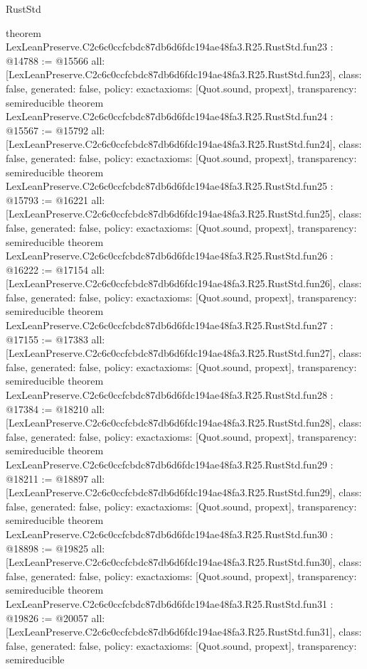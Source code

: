 \begin{lexlean}{RustStd}
\begin{coremodule}
{}
theorem LexLeanPreserve.C2c6c0ccfcbdc87db6d6fdc194ae48fa3.R25.RustStd.fun23 : @14788 := @15566 {
  all: [LexLeanPreserve.C2c6c0ccfcbdc87db6d6fdc194ae48fa3.R25.RustStd.fun23],
  class: false,
  generated: false,
  policy: exact{axioms: [Quot.sound, propext]},
  transparency: semireducible
}
theorem LexLeanPreserve.C2c6c0ccfcbdc87db6d6fdc194ae48fa3.R25.RustStd.fun24 : @15567 := @15792 {
  all: [LexLeanPreserve.C2c6c0ccfcbdc87db6d6fdc194ae48fa3.R25.RustStd.fun24],
  class: false,
  generated: false,
  policy: exact{axioms: [Quot.sound, propext]},
  transparency: semireducible
}
theorem LexLeanPreserve.C2c6c0ccfcbdc87db6d6fdc194ae48fa3.R25.RustStd.fun25 : @15793 := @16221 {
  all: [LexLeanPreserve.C2c6c0ccfcbdc87db6d6fdc194ae48fa3.R25.RustStd.fun25],
  class: false,
  generated: false,
  policy: exact{axioms: [Quot.sound, propext]},
  transparency: semireducible
}
theorem LexLeanPreserve.C2c6c0ccfcbdc87db6d6fdc194ae48fa3.R25.RustStd.fun26 : @16222 := @17154 {
  all: [LexLeanPreserve.C2c6c0ccfcbdc87db6d6fdc194ae48fa3.R25.RustStd.fun26],
  class: false,
  generated: false,
  policy: exact{axioms: [Quot.sound, propext]},
  transparency: semireducible
}
theorem LexLeanPreserve.C2c6c0ccfcbdc87db6d6fdc194ae48fa3.R25.RustStd.fun27 : @17155 := @17383 {
  all: [LexLeanPreserve.C2c6c0ccfcbdc87db6d6fdc194ae48fa3.R25.RustStd.fun27],
  class: false,
  generated: false,
  policy: exact{axioms: [Quot.sound, propext]},
  transparency: semireducible
}
theorem LexLeanPreserve.C2c6c0ccfcbdc87db6d6fdc194ae48fa3.R25.RustStd.fun28 : @17384 := @18210 {
  all: [LexLeanPreserve.C2c6c0ccfcbdc87db6d6fdc194ae48fa3.R25.RustStd.fun28],
  class: false,
  generated: false,
  policy: exact{axioms: [Quot.sound, propext]},
  transparency: semireducible
}
theorem LexLeanPreserve.C2c6c0ccfcbdc87db6d6fdc194ae48fa3.R25.RustStd.fun29 : @18211 := @18897 {
  all: [LexLeanPreserve.C2c6c0ccfcbdc87db6d6fdc194ae48fa3.R25.RustStd.fun29],
  class: false,
  generated: false,
  policy: exact{axioms: [Quot.sound, propext]},
  transparency: semireducible
}
theorem LexLeanPreserve.C2c6c0ccfcbdc87db6d6fdc194ae48fa3.R25.RustStd.fun30 : @18898 := @19825 {
  all: [LexLeanPreserve.C2c6c0ccfcbdc87db6d6fdc194ae48fa3.R25.RustStd.fun30],
  class: false,
  generated: false,
  policy: exact{axioms: [Quot.sound, propext]},
  transparency: semireducible
}
theorem LexLeanPreserve.C2c6c0ccfcbdc87db6d6fdc194ae48fa3.R25.RustStd.fun31 : @19826 := @20057 {
  all: [LexLeanPreserve.C2c6c0ccfcbdc87db6d6fdc194ae48fa3.R25.RustStd.fun31],
  class: false,
  generated: false,
  policy: exact{axioms: [Quot.sound, propext]},
  transparency: semireducible
}
\end{coremodule}
\end{lexlean}
